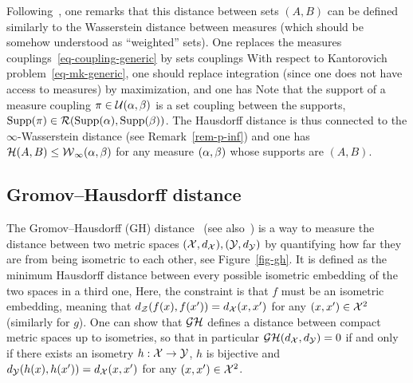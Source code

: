 Following~\citet{memoli-2011}, one remarks that this distance between sets $(A,B)$ can be defined similarly to the Wasserstein distance between measures (which should be somehow understood as ``weighted'' sets). One replaces the measures couplings~\eqref{eq-coupling-generic} by sets couplings
With respect to Kantorovich problem~\eqref{eq-mk-generic}, one should replace integration (since one does not have access to measures) by maximization, and one has
%
Note that the support of a measure coupling $\pi \in \mathcal{U}(\alpha,\beta)$ is a set coupling between the supports, \ie $\operatorname{Supp}(\pi) \in \mathcal{R}( \operatorname{Supp}(\alpha),\operatorname{Supp}(\beta) )$.
%
The Hausdorff distance is thus connected to the $\infty$-Wasserstein distance (see Remark~\ref{rem-p-inf}) and one has $\mathcal{H}(A,B) \leq \operatorname{\mathcal{W}}_\infty(\alpha,\beta)$ for any measure $(\alpha,\beta)$ whose supports are $(A,B)$.


\subsection{Gromov--Hausdorff distance}

The Gromov--Hausdorff (GH) distance~\citep{gromov-2001} (see also~\citep{edwards1975structure}) is a way to measure the distance between two metric spaces $(\mathcal{X},d_{\mathcal{X}}), (\mathcal{Y},d_{\mathcal{Y}})$ by quantifying how far they are from being isometric to each other, see Figure~\ref{fig-gh}. It is defined as the minimum Hausdorff distance between every possible isometric embedding of the two spaces in a third one,
Here, the constraint is that $f$ must be an isometric embedding, meaning that $d_{\mathcal{Z}}(f(x),f(x'))=d_{\mathcal{X}}(x,x')$ for any $(x,x') \in \mathcal{X}^2$ (similarly for $g$). One can show that $\mathcal{G}\mathcal{H}$ defines a distance between compact metric spaces up to isometries, so that in particular $\mathcal{G}\mathcal{H}(d_{\mathcal{X}},d_{\mathcal{Y}})=0$ if and only if there exists an isometry $h : \mathcal{X} \rightarrow \mathcal{Y}$, \ie $h$ is bijective and $d_{\mathcal{Y}}(h(x),h(x'))=d_{\mathcal{X}}(x,x')$ for any $(x,x') \in \mathcal{X}^2$. 

